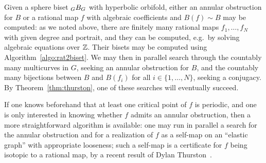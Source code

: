 \documentclass{amsart}
\begin{document}
Given a sphere biset $\subscript G B_G$ with hyperbolic orbifold,
either an annular obstruction for $B$ or a rational map $f$ with
algebraic coefficients and $B(f)\sim B$ may be computed: as we noted
above, there are finitely many rational maps $f_1,\dots,f_N$ with
given degree and portrait, and they can be computed, e.g.\ by solving
algebraic equations over ${\mathbb Z}$. Their bisets may be computed using
Algorithm~\ref{algo:rat2biset}. We may then in parallel search through
the countably many multicurves in $G$, seeking an annular obstruction
for $B$, and the countably many bijections between $B$ and $B(f_i)$
for all $i\in\{1,\dots,N\}$, seeking a conjugacy. By
Theorem~\ref{thm:thurston}, one of these searches will eventually
succeed.

If one knows beforehand that at least one critical point of $f$ is
periodic, and one is only interested in knowing whether $f$ admits an
annular obstruction, then a more straightforward algorithm is
available: one may run in parallel a search for the annular
obstruction and for a realization of $f$ as a self-map on an ``elastic
graph'' with appropriate looseness; such a self-map is a certificate
for $f$ being isotopic to a rational map, by a recent result of Dylan
Thurston~\cite{thurston:rubber}.
\end{document}
